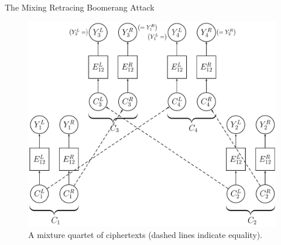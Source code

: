 \documentclass[notheorems]{beamer}
\theoremstyle{definition}
\theoremstyle{example}
\begin{document}
    \begin{frame}{The Mixing Retracing Boomerang Attack}
        \begin{figure}
            \centering
            \includegraphics[width=0.55\columnwidth]{images/mixing_boomerang.png}
            \caption{A mixture quartet of ciphertexts (dashed lines indicate equality).}
        \end{figure}
    \end{frame}
\end{document}
